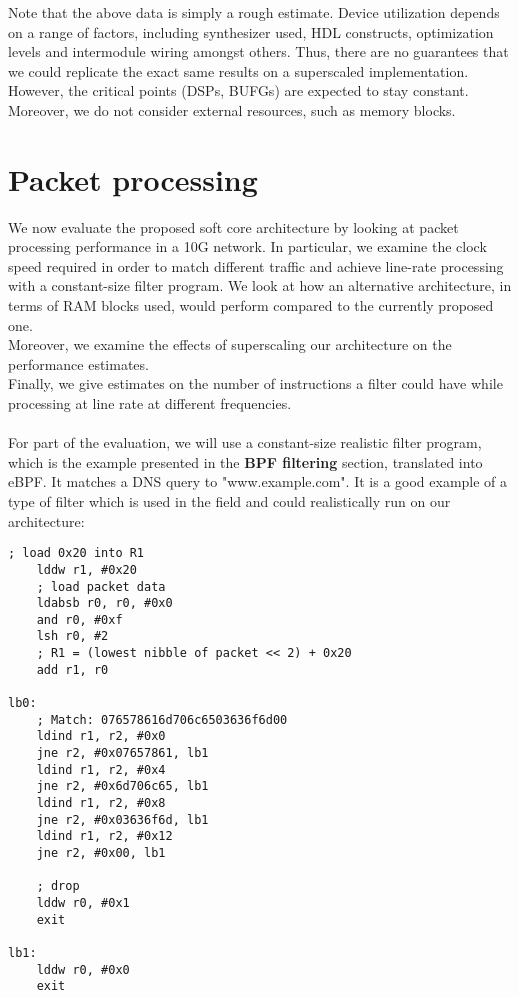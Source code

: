 \documentclass{l4proj}
\begin{document}
Note that the above data is simply a rough estimate. Device utilization depends on a range of factors, including synthesizer used, HDL constructs, optimization levels and intermodule wiring amongst others. Thus, there are no guarantees that we could replicate the exact same results on a superscaled implementation. However, the critical points (DSPs, BUFGs) are expected to stay constant.\\
Moreover, we do not consider external resources, such as memory blocks.

\section{Packet processing}
We now evaluate the proposed soft core architecture by looking at packet processing performance in a 10G network. In particular, we examine the clock speed required in order to match different traffic and achieve line-rate processing with a constant-size filter program. We look at how an alternative architecture, in terms of RAM blocks used, would perform compared to the currently proposed one.\\
Moreover, we examine the effects of superscaling our architecture on the performance estimates.\\
Finally, we give estimates on the number of instructions a filter could have while processing at line rate at different frequencies.\\\\
For part of the evaluation, we will use a constant-size realistic filter program, which is the example presented in the \textbf{BPF filtering} section, translated into eBPF. It matches a DNS query to "www.example.com". It is a good example of a type of filter which is used in the field and could realistically run on our architecture:
\begin{lstlisting}[language=ebpfAsm]
    ; load 0x20 into R1
    lddw r1, #0x20
    ; load packet data
    ldabsb r0, r0, #0x0
    and r0, #0xf
    lsh r0, #2
    ; R1 = (lowest nibble of packet << 2) + 0x20
    add r1, r0
    
lb0:
    ; Match: 076578616d706c6503636f6d00
    ldind r1, r2, #0x0
    jne r2, #0x07657861, lb1
    ldind r1, r2, #0x4
    jne r2, #0x6d706c65, lb1
    ldind r1, r2, #0x8
    jne r2, #0x03636f6d, lb1
    ldind r1, r2, #0x12
    jne r2, #0x00, lb1
    
    ; drop
    lddw r0, #0x1
    exit
    
lb1:
    lddw r0, #0x0
    exit
\end{lstlisting}
\end{document}
